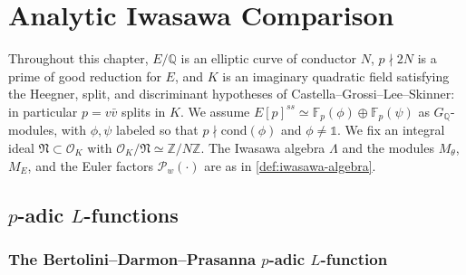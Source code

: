 \providecommand{\Lcal}{\mathcal{L}}
\providecommand{\rH}{\mathrm{H}}
\providecommand{\Fcal}{\mathcal{F}}

\chapter{Analytic Iwasawa Comparison}
\label{chap:analytic-comparison}


Throughout this chapter, \(E/\mathbb{Q}\) is an elliptic curve of conductor \(N\), \(p\nmid 2N\) is a prime of good reduction for \(E\), and \(K\) is an imaginary quadratic field satisfying the Heegner, split, and discriminant hypotheses of Castella--Grossi--Lee--Skinner: in particular \(p = v\bar{v}\) splits in \(K\). We assume \(E[p]^{ss} \simeq \mathbb{F}_p(\phi)\oplus\mathbb{F}_p(\psi)\) as \(G_{\mathbb{Q}}\)-modules, with \(\phi,\psi\) labeled so that \(p\nmid\mathrm{cond}(\phi)\) and \(\phi\neq\mathds{1}\). We fix an integral ideal \(\mathfrak{N}\subset\mathcal{O}_K\) with \(\mathcal{O}_K/\mathfrak{N}\simeq\mathbb{Z}/N\mathbb{Z}\). The Iwasawa algebra \(\Lambda\) and the modules \(M_\theta\), \(M_E\), and the Euler factors \(\mathcal{P}_w(\cdot)\) are as in \cref{def:iwasawa-algebra}.

\section{\texorpdfstring{\(p\)}{p}-adic \texorpdfstring{\(L\)}{L}-functions}

\subsection{The Bertolini--Darmon--Prasanna \texorpdfstring{\(p\)}{p}-adic \texorpdfstring{\(L\)}{L}-function}


